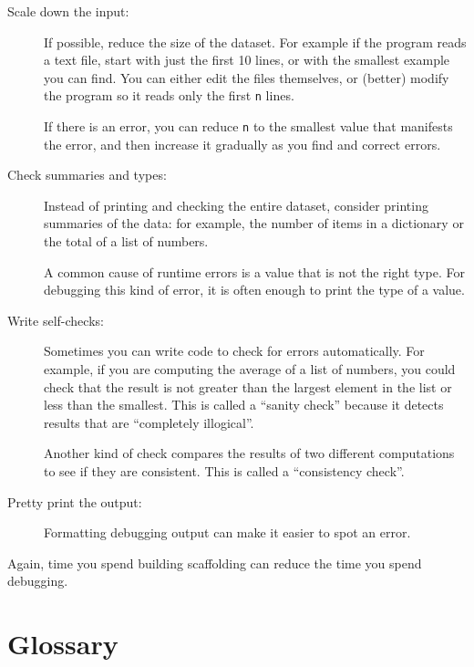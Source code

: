 \begin{description}

\item[Scale down the input:] If possible, reduce the size of the
dataset.  For example if the program reads a text file, start with
just the first 10 lines, or with the smallest example you can find.
You can either edit the files themselves, or (better) modify the
program so it reads only the first {\tt n} lines.

If there is an error, you can reduce {\tt n} to the smallest
value that manifests the error, and then increase it gradually
as you find and correct errors.

\item[Check summaries and types:] Instead of printing and checking the
entire dataset, consider printing summaries of the data: for example,
the number of items in a dictionary or the total of a list of numbers.

A common cause of runtime errors is a value that is not the right
type.  For debugging this kind of error, it is often enough to print
the type of a value.

\item[Write self-checks:]  Sometimes you can write code to check
for errors automatically.  For example, if you are computing the
average of a list of numbers, you could check that the result is
not greater than the largest element in the list or less than
the smallest.  This is called a ``sanity check'' because it detects
results that are ``completely illogical''.


Another kind of check compares the results of two different
computations to see if they are consistent.  This is called a
``consistency check''.

\item[Pretty print the output:] Formatting debugging output
can make it easier to spot an error.  

\end{description}

Again, time you spend building scaffolding can reduce
the time you spend debugging.


\section{Glossary}

